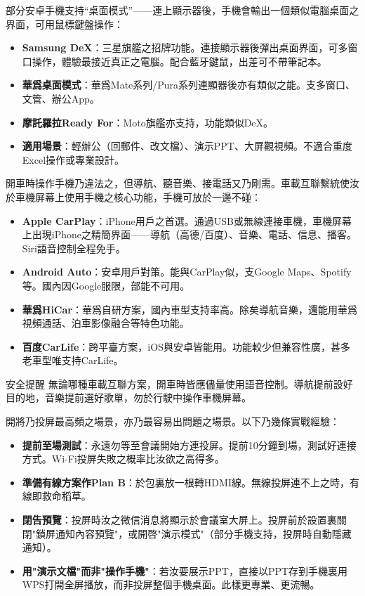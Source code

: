 
部分安卓手機支持“桌面模式”——連上顯示器後，手機會輸出一個類似電腦桌面之界面，可用鼠標鍵盤操作：

\begin{itemize}
  \item \textbf{Samsung DeX}：三星旗艦之招牌功能。連接顯示器後彈出桌面界面，可多窗口操作，體驗最接近真正之電腦。配合藍牙鍵鼠，出差可不帶筆記本。
  \item \textbf{華爲桌面模式}：華爲Mate系列/Pura系列連顯器後亦有類似之能。支多窗口、文管、辦公App。
  \item \textbf{摩託羅拉Ready For}：Moto旗艦亦支持，功能類似DeX。
  \item \textbf{適用場景}：輕辦公（回郵件、改文檔）、演示PPT、大屏觀視頻。不適合重度Excel操作或專業設計。
\end{itemize}


開車時操作手機乃違法之，但導航、聽音樂、接電話又乃剛需。車載互聯繫統使汝於車機屏幕上使用手機之核心功能，手機可放於一邊不碰：

\begin{itemize}
  \item \textbf{Apple CarPlay}：iPhone用戶之首選。通過USB或無線連接車機，車機屏幕上出現iPhone之精簡界面——導航（高德/百度）、音樂、電話、信息、播客。Siri語音控制全程免手。
  \item \textbf{Android Auto}：安卓用戶對策。能與CarPlay似，支Google Maps、Spotify等。國內因Google服限，部能不可用。
  \item \textbf{華爲HiCar}：華爲自研方案，國內車型支持率高。除矣導航音樂，還能用華爲視頻通話、泊車影像融合等特色功能。
  \item \textbf{百度CarLife}：跨平臺方案，iOS與安卓皆能用。功能較少但兼容性廣，甚多老車型唯支持CarLife。
\end{itemize}

\begin{tcbwarn}{安全提醒}
無論哪種車載互聯方案，開車時皆應儘量使用語音控制。導航提前設好目的地，音樂提前選好歌單，勿於行駛中操作車機屏幕。

\end{tcbwarn}


開將乃投屏最高頻之場景，亦乃最容易出問題之場景。以下乃幾條實戰經驗：

\begin{itemize}
  \item \textbf{提前至場測試}：永遠勿等至會議開始方連投屏。提前10分鐘到場，測試好連接方式。Wi-Fi投屏失敗之概率比汝欲之高得多。
  \item \textbf{準備有線方案作Plan B}：於包裏放一根轉HDMI線。無線投屏連不上之時，有線即救命稻草。
  \item \textbf{閉告預覽}：投屏時汝之微信消息將顯示於會議室大屏上。投屏前於設置裏關閉"鎖屏通知內容預覽"，或開啓"演示模式"（部分手機支持，投屏時自動隱藏通知）。
  \item \textbf{用"演示文檔"而非"操作手機"}：若汝要展示PPT，直接以PPT存到手機裏用WPS打開全屏播放，而非投屏整個手機桌面。此樣更專業、更流暢。
\end{itemize}

